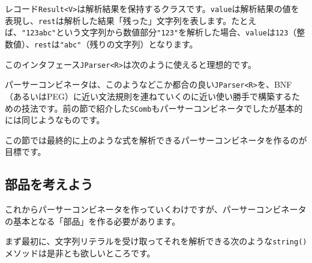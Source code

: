レコード\texttt{Result\textless{}V\textgreater{}}は解析結果を保持するクラスです。\texttt{value}は解析結果の値を表現し、\texttt{rest}は解析した結果「残った」文字列を表します。たとえば、\texttt{"123abc"}という文字列から数値部分\texttt{"123"}を解析した場合、\texttt{value}は\texttt{123}（整数値）、\texttt{rest}は\texttt{"abc"}（残りの文字列）となります。

このインタフェース\texttt{JParser\textless{}R\textgreater{}}は次のように使えると理想的です。

\begin{Shaded}
\begin{Highlighting}[]
\NormalTok{\textless{}}\NormalTok{(}\NormalTok{);}
\NormalTok{();}
\end{Highlighting}
\end{Shaded}

パーサーコンビネータは、このようなどこか都合の良い\texttt{JParser\textless{}R\textgreater{}}を、BNF（あるいはPEG）に近い文法規則を連ねていくのに近い使い勝手で構築するための技法です。前の節で紹介した\texttt{SComb}もパーサーコンビネータでしたが基本的には同じようなものです。

この節では最終的に上のような式を解析できるパーサーコンビネータを作るのが目標です。

\hypertarget{chapter6-ux90e8ux54c1ux3092ux8003ux3048ux3088ux3046}{%
\subsection{部品を考えよう}\label{chapter6-ux90e8ux54c1ux3092ux8003ux3048ux3088ux3046}}

これからパーサーコンビネータを作っていくわけですが、パーサーコンビネータの基本となる「部品」を作る必要があります。

まず最初に、文字列リテラルを受け取ってそれを解析できる次のような\texttt{string()}メソッドは是非とも欲しいところです。

\begin{Shaded}
\begin{Highlighting}[]
 \NormalTok{\textless{}}\NormalTok{\textgreater{}(}\NormalTok{, }\NormalTok{(}\NormalTok{(}\NormalTok{(}\NormalTok{));}
\end{Highlighting}
\end{Shaded}

